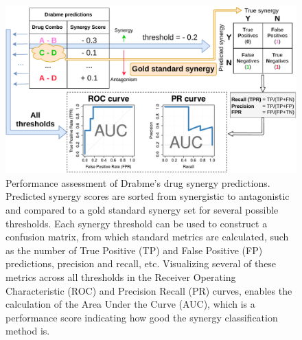 \documentclass[
  12pt,
]{book}
\begin{document}
\begin{figure}
\centering
\includegraphics{img/drabme_synergy_roc.pdf}
\caption{\label{fig:fig6}Performance assessment of Drabme's drug synergy predictions. Predicted synergy scores are sorted from synergistic to antagonistic and compared to a gold standard synergy set for several possible thresholds. Each synergy threshold can be used to construct a confusion matrix, from which standard metrics are calculated, such as the number of True Positive (TP) and False Positive (FP) predictions, precision and recall, etc. Visualizing several of these metrics across all thresholds in the Receiver Operating Characteristic (ROC) and Precision Recall (PR) curves, enables the calculation of the Area Under the Curve (AUC), which is a performance score indicating how good the synergy classification method is.}
\end{figure}
\end{document}
